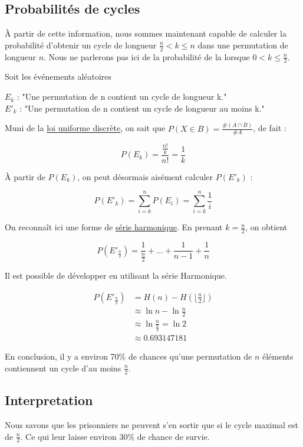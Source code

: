 \subsection{Probabilités de cycles}

	À partir de cette information, nous sommes maintenant capable de calculer la probabilité d'obtenir un cycle de longueur $\frac{n}{2} < k \leq n$ dans une permutation de longueur $n$.
	Nous ne parlerons pas ici de la probabilité de la lorsque $0 < k \leq \frac{n}{2}$.

	Soit les événements aléatoires
	\begin{center}
		$E_k$ : "Une permutation de n contient un cycle de longueur k." \\
		$E'_k$ : "Une permutation de n contient un cycle de longueur au moins k."
	\end{center}

	Muni de la \href{https://fr.wikipedia.org/wiki/Loi_uniforme_discr%C3%A8te#Calcul_d'une_probabilit%C3%A9}{loi uniforme discrète}, on sait que $P(X \in B) = \frac{\#(A \cap B)}{\#A}$, de fait :

	\begin{equation}
		P(E_k) = \frac{\frac{n!}{k}}{n!} = \frac{1}{k}
	\end{equation}

	\newpage
	À partir de $P(E_k)$, on peut désormais aisément calculer $P(E'_k)$ :

	\begin{equation}
		P(E'_k) = \sum_{i = k}^{n} P(E_i) = \sum_{i = k}^{n} \frac{1}{i}
	\end{equation}

	On reconnaît ici une forme de \href{https://en.wikipedia.org/wiki/Harmonic_series_(mathematics)#}{série harmonique}.
	En prenant $k = \frac{n}{2}$, on obtient

	\begin{equation}
		P(E'_{\frac{n}{2}}) = \frac{1}{\frac{n}{2}} + \hdots + \frac{1}{n - 1} + \frac{1}{n}
	\end{equation}

	Il est possible de développer en utilisant la série Harmonique.

	\begin{align*}
		P(E'_{\frac{n}{2}}) & = H(n) - H(\lfloor \frac{n}{2} \rfloor)     \\
		                    & \approx \ln{n} - \ln{\frac{n}{2}}           \\
		                    & \approx \ln{\frac{n}{\frac{n}{2}}} = \ln{2} \\
		                    & \approx 0.693147181
	\end{align*}

	En conclusion, il y a environ 70\% de chances qu'une permutation de $n$ éléments contiennent un cycle d'au moins $\frac{n}{2}$.

\subsection{Interpretation}

Nous savons que les prisonniers ne peuvent s'en sortir que si le cycle maximal est de $\frac{n}{2}$.
Ce qui leur laisse environ 30\% de chance de survie.

